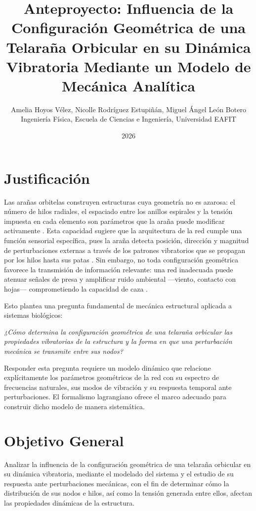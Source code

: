 \documentclass[11pt,letterpaper]{article}
\title{
    \textbf{\LARGE Anteproyecto: Influencia de la Configuración Geométrica
    de una Telaraña Orbicular en su Dinámica Vibratoria
    Mediante un Modelo de Mecánica Analítica}
}
\author{
    Amelia Hoyos Vélez,
    Nicolle Rodríguez Estupiñán,
    Miguel Ángel León Botero\\[0.3cm]
    \small Ingeniería Física,
    Escuela de Ciencias e Ingeniería,
    Universidad EAFIT
}
\date{2026}
\begin{document}
\maketitle


\section{Justificación}

Las arañas orbitelas construyen estructuras cuya geometría no es azarosa:
el número de hilos radiales, el espaciado entre los anillos espirales y la
tensión impuesta en cada elemento son parámetros que la araña puede modificar
activamente \cite{mortimer2016,mortimer2019}. Esta capacidad sugiere que la
arquitectura de la red cumple una función sensorial específica, pues la araña
detecta posición, dirección y magnitud de perturbaciones externas a través de
los patrones vibratorios que se propagan por los hilos hasta sus patas
\cite{masters1981,mortimer2019}. Sin embargo, no toda configuración geométrica
favorece la transmisión de información relevante: una red inadecuada puede
atenuar señales de presa y amplificar ruido ambiental ---viento, contacto con
hojas--- comprometiendo la capacidad de caza \cite{mortimer2016,nakata2010}.

Esto plantea una pregunta fundamental de mecánica estructural aplicada a
sistemas biológicos:

\medskip
\begin{center}
\textit{¿Cómo determina la configuración geométrica de una telaraña orbicular
las propiedades vibratorias de la estructura y la forma en que una perturbación
mecánica se transmite entre sus nodos?}
\end{center}
\medskip

Responder esta pregunta requiere un modelo dinámico que relacione
explícitamente los parámetros geométricos de la red con su espectro de
frecuencias naturales, sus modos de vibración y su respuesta temporal ante
perturbaciones. El formalismo lagrangiano ofrece el marco adecuado para
construir dicho modelo de manera sistemática.

\section{Objetivo General}
Analizar la influencia de la configuración geométrica de una telaraña orbicular en su dinámica vibratoria, mediante el modelado del sistema y el estudio de su respuesta ante perturbaciones mecánicas, con el fin de determinar cómo la distribución de sus nodos e hilos, así como la tensión generada entre ellos, afectan las propiedades dinámicas de la estructura.
\end{document}
